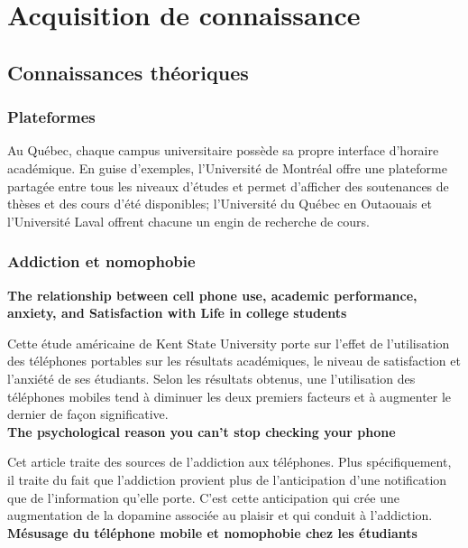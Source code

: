 \section{Acquisition de connaissance}

	\subsection{Connaissances théoriques}
		\subsubsection{Plateformes}
		Au Québec, chaque campus universitaire possède sa propre interface d'horaire académique. En guise d'exemples, l'Université de Montréal offre une plateforme partagée entre tous les niveaux d'études et permet d'afficher des soutenances de thèses et des cours d'été disponibles; l'Université du Québec en Outaouais et l'Université Laval offrent chacune un engin de recherche de cours.
		
		\subsubsection{Addiction et nomophobie}
		
		{\bfseries \cite{relationship} The relationship between cell phone use, academic performance, anxiety, and Satisfaction with Life in college students}	
		
		Cette étude américaine de Kent State University porte sur l'effet de l'utilisation des téléphones portables sur les résultats académiques, le niveau de satisfaction et l'anxiété de ses étudiants. Selon les résultats obtenus, une l'utilisation des téléphones mobiles tend à diminuer les deux premiers facteurs et à augmenter le dernier de façon significative. \\
		
		{\bfseries \cite{cannotStop} The psychological reason you can't stop checking your phone}
		
		Cet article traite des sources de l'addiction aux téléphones. Plus spécifiquement, il traite du fait que l'addiction provient plus de l'anticipation d'une notification que de l'information qu'elle porte. C'est cette anticipation qui crée une augmentation de la dopamine associée au plaisir et qui conduit à l'addiction. \\
		
		{\bfseries \cite{mesusage} Mésusage du téléphone mobile et nomophobie chez les étudiants}
		
